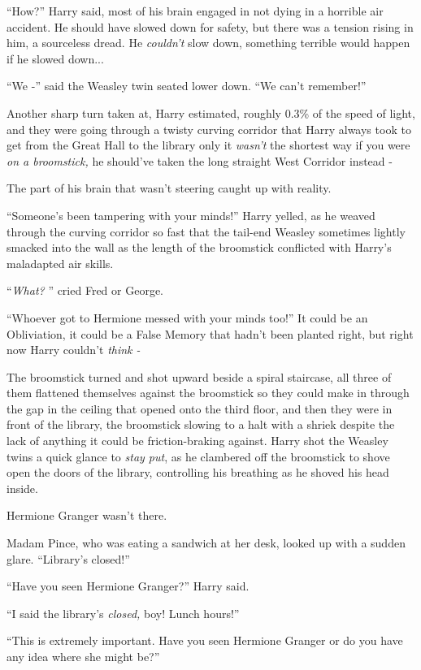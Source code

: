 ``How?'' Harry said, most of his brain engaged in not dying in a
horrible air accident. He should have slowed down for safety, but there
was a tension rising in him, a sourceless dread. He \emph{couldn't} slow
down, something terrible would happen if he slowed down...

``We -'' said the Weasley twin seated lower down. ``We can't remember!''

Another sharp turn taken at, Harry estimated, roughly 0.3\% of the speed
of light, and they were going through a twisty curving corridor that
Harry always took to get from the Great Hall to the library only it
\emph{wasn't} the shortest way if you were \emph{on a broomstick,} he
should've taken the long straight West Corridor instead -

The part of his brain that wasn't steering caught up with reality.

``Someone's been tampering with your minds!'' Harry yelled, as he weaved
through the curving corridor so fast that the tail-end Weasley sometimes
lightly smacked into the wall as the length of the broomstick conflicted
with Harry's maladapted air skills.

``\emph{What?} '' cried Fred or George.

``Whoever got to Hermione messed with your minds too!'' It could be an
Obliviation, it could be a False Memory that hadn't been planted right,
but right now Harry couldn't \emph{think -}

The broomstick turned and shot upward beside a spiral staircase, all
three of them flattened themselves against the broomstick so they could
make in through the gap in the ceiling that opened onto the third floor,
and then they were in front of the library, the broomstick slowing to a
halt with a shriek despite the lack of anything it could be
friction-braking against. Harry shot the Weasley twins a quick glance to
\emph{stay put}, as he clambered off the broomstick to shove open the
doors of the library, controlling his breathing as he shoved his head
inside.

Hermione Granger wasn't there.

Madam Pince, who was eating a sandwich at her desk, looked up with a
sudden glare. ``Library's closed!''

``Have you seen Hermione Granger?'' Harry said.

``I said the library's \emph{closed,} boy! Lunch hours!''

``This is extremely important. Have you seen Hermione Granger or do you
have any idea where she might be?''

